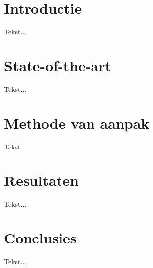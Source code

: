 \documentclass[fleqn,10pt]{voorstel}
\begin{document}
\flushbottom %

\maketitle %

\tableofcontents %

\thispagestyle{empty} %


\section{Introductie} %
Tekst...


\section{State-of-the-art}
Tekst...


\section{Methode van aanpak}
Tekst... \citep{3dmark_cmd} \citep{3dmark_tech} \citep{3dmark_light}

\section{Resultaten}
Tekst...

\section{Conclusies}
Tekst...




\end{document}
